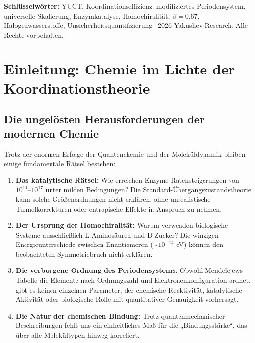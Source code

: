 \documentclass[12pt,a4paper]{article}
\begin{document}
\begin{titlepage}
\begin{abstract}
		\end{abstract}
		\vspace{1cm}
		\noindent
		\small\textbf{Schlüsselwörter:} YUCT, Koordinationseffizienz, modifiziertes Periodensystem, universelle Skalierung, Enzymkatalyse, Homochiralität, $\beta=0.67$, Halogenwasserstoffe, Unsicherheitsquantifizierung
		\vspace{0.5cm}
		\noindent
		\textcopyright\ 2026 Yakushev Research. Alle Rechte vorbehalten.
	\end{titlepage}
	
	\tableofcontents
	\newpage
	
	\section{Einleitung: Chemie im Lichte der Koordinationstheorie}
	\label{sec:intro}
	
	\subsection{Die ungelösten Herausforderungen der modernen Chemie}
	
	Trotz der enormen Erfolge der Quantenchemie und der Moleküldynamik bleiben einige fundamentale Rätsel bestehen:
	
	\begin{enumerate}
		\item \textbf{Das katalytische Rätsel:} Wie erreichen Enzyme Ratensteigerungen von $10^{10}$--$10^{17}$ unter milden Bedingungen? Die Standard-Übergangszustandstheorie kann solche Größenordnungen nicht erklären, ohne unrealistische Tunnelkorrekturen oder entropische Effekte in Anspruch zu nehmen.
		\item \textbf{Der Ursprung der Homochiralität:} Warum verwenden biologische Systeme ausschließlich L-Aminosäuren und D-Zucker? Die winzigen Energieunterschiede zwischen Enantiomeren ($\sim 10^{-14}$ eV) können den beobachteten Symmetriebruch nicht erklären.
		\item \textbf{Die verborgene Ordnung des Periodensystems:} Obwohl Mendelejews Tabelle die Elemente nach Ordnungszahl und Elektronenkonfiguration ordnet, gibt es keinen einzelnen Parameter, der chemische Reaktivität, katalytische Aktivität oder biologische Rolle mit quantitativer Genauigkeit vorhersagt.
		\item \textbf{Die Natur der chemischen Bindung:} Trotz quantenmechanischer Beschreibungen fehlt uns ein einheitliches Maß für die „Bindungsstärke“, das über alle Molekültypen hinweg korreliert.
	\end{enumerate}
	
\end{document}
